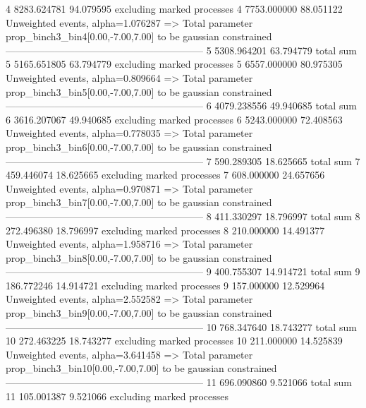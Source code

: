 4          8283.624781     94.079595       excluding marked processes    
4          7753.000000     88.051122       Unweighted events, alpha=1.076287
  => Total parameter prop_binch3_bin4[0.00,-7.00,7.00] to be gaussian constrained
------------------------------------------------------------
5          5308.964201     63.794779       total sum                     
5          5165.651805     63.794779       excluding marked processes    
5          6557.000000     80.975305       Unweighted events, alpha=0.809664
  => Total parameter prop_binch3_bin5[0.00,-7.00,7.00] to be gaussian constrained
------------------------------------------------------------
6          4079.238556     49.940685       total sum                     
6          3616.207067     49.940685       excluding marked processes    
6          5243.000000     72.408563       Unweighted events, alpha=0.778035
  => Total parameter prop_binch3_bin6[0.00,-7.00,7.00] to be gaussian constrained
------------------------------------------------------------
7          590.289305      18.625665       total sum                     
7          459.446074      18.625665       excluding marked processes    
7          608.000000      24.657656       Unweighted events, alpha=0.970871
  => Total parameter prop_binch3_bin7[0.00,-7.00,7.00] to be gaussian constrained
------------------------------------------------------------
8          411.330297      18.796997       total sum                     
8          272.496380      18.796997       excluding marked processes    
8          210.000000      14.491377       Unweighted events, alpha=1.958716
  => Total parameter prop_binch3_bin8[0.00,-7.00,7.00] to be gaussian constrained
------------------------------------------------------------
9          400.755307      14.914721       total sum                     
9          186.772246      14.914721       excluding marked processes    
9          157.000000      12.529964       Unweighted events, alpha=2.552582
  => Total parameter prop_binch3_bin9[0.00,-7.00,7.00] to be gaussian constrained
------------------------------------------------------------
10         768.347640      18.743277       total sum                     
10         272.463225      18.743277       excluding marked processes    
10         211.000000      14.525839       Unweighted events, alpha=3.641458
  => Total parameter prop_binch3_bin10[0.00,-7.00,7.00] to be gaussian constrained
------------------------------------------------------------
11         696.090860      9.521066        total sum                     
11         105.001387      9.521066        excluding marked processes    
